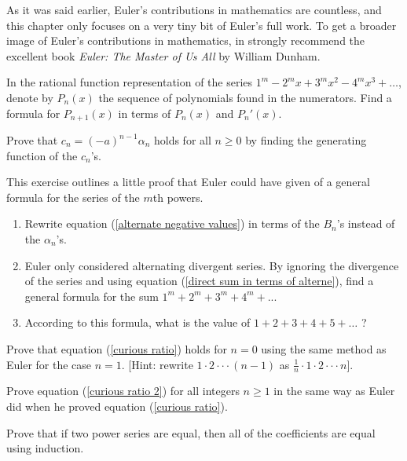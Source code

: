 As it was said earlier, Euler's contributions in mathematics are countless, and this chapter only focuses on a very tiny bit of Euler's full work. To get a broader image of Euler's contributions in mathematics, in strongly recommend the excellent book \textit{Euler: The Master of Us All} \cite{dunham1999euler} by William Dunham.\\


\begin{exercise}
In the rational function representation of the series $1^m - 2^mx + 3^m x^2 - 4^m x^3 + \dots$, denote by $P_n(x)$ the sequence of polynomials found in the numerators. Find a formula for $P_{n+1}(x)$ in terms of $P_n(x)$ and $P_n'(x)$.
\end{exercise}

\begin{exercise} \label{ex: c_n generating function}
    Prove that $c_n = (-a)^{n-1}\alpha_n$ holds for all $n \geq 0$ by finding the generating function of the $c_n$'s.
\end{exercise}

\begin{exercise}
    This exercise outlines a little proof that Euler could have given of a general formula for the series of the $m$th powers.
    \begin{enumerate}[label=(\alph*)]
        \item Rewrite equation (\ref{alternate negative values}) in terms of the $B_n$'s instead of the $\alpha_n$'s.
        \item Euler only considered alternating divergent series. By ignoring the divergence of the series and using equation (\ref{direct sum in terms of alterne}), find a general formula for the sum $1^m + 2^m + 3^m + 4^m + ...$
        \item According to this formula, what is the value of $1 + 2 + 3 + 4 + 5 + \dots$ ?
    \end{enumerate}
\end{exercise}

\begin{exercise} \label{ex: curious ratio n=0}
    Prove that equation (\ref{curious ratio}) holds for $n = 0$ using the same method as Euler for the case $n = 1$. [Hint: rewrite $1\cdot 2 \cdot \cdot \cdot (n-1)$ as $\frac{1}{n}\cdot 1 \cdot 2 \cdot \cdot \cdot n$].
\end{exercise}

\begin{exercise} \label{ex: curious ratio 2}
    Prove equation (\ref{curious ratio 2}) for all integers $n \geq 1$ in the same way as Euler did when he proved equation (\ref{curious ratio}).
\end{exercise}

\begin{exercise}
    Prove that if two power series are equal, then all of the coefficients are equal using induction.
\end{exercise}